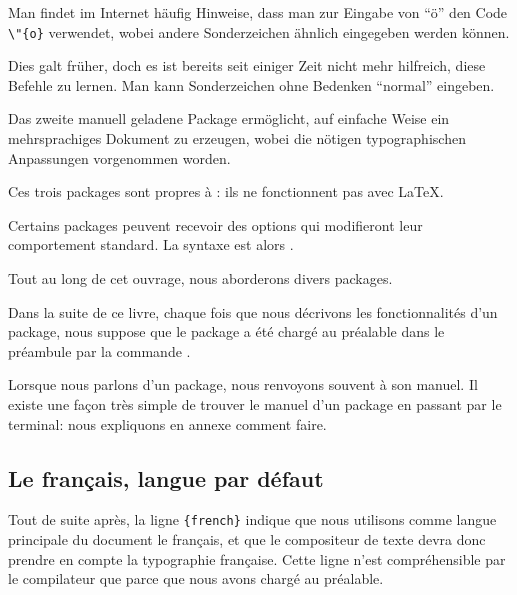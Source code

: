 \begin{plusloins}
Man findet im Internet häufig Hinweise, dass man zur Eingabe von \enquote{ö} den Code \verb|\"{o}| verwendet, wobei andere Sonderzeichen ähnlich eingegeben werden können. 

Dies galt früher, doch es ist bereits seit einiger Zeit nicht mehr hilfreich, diese Befehle zu lernen. Man kann Sonderzeichen ohne Bedenken \enquote{normal} eingeben. 
\end{plusloins}

Das zweite manuell geladene Package  ermöglicht, auf einfache Weise ein mehrsprachiges Dokument zu erzeugen, wobei die nötigen typographischen Anpassungen vorgenommen worden.

Ces trois packages sont propres à \XeLaTeX  : ils ne fonctionnent pas avec \LaTeX.

Certains packages peuvent recevoir des options qui modifieront leur comportement standard. La syntaxe est alors .

Tout au long de cet ouvrage, nous aborderons divers packages.

\begin{attention}
Dans la suite de ce livre, chaque fois que nous décrivons les fonctionnalités d'un package, nous suppose que  le package a été chargé au préalable dans le préambule par la commande .
\end{attention}

\begin{plusloins}
Lorsque nous parlons d'un package, nous renvoyons souvent à son manuel. Il existe une façon très simple de trouver le manuel d'un package en passant par le terminal: nous expliquons en annexe comment faire.
\end{plusloins}

\subsection{Le français, langue par défaut\label{french}}

Tout de suite après, la ligne \verb|{french}| indique que nous utilisons comme langue principale du document le français, et  que le compositeur de texte devra   donc prendre en compte la typographie fran\c caise. Cette ligne n'est compréhensible par le compilateur que parce que nous avons chargé  au préalable.

